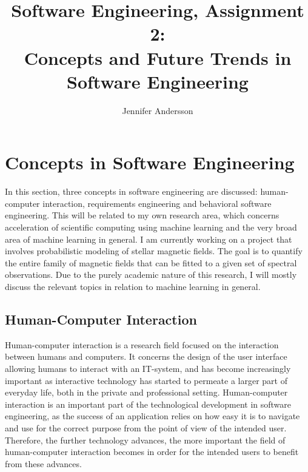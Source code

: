 \documentclass{article}
\title{Software Engineering, Assignment 2: \\ Concepts and Future Trends in Software Engineering}
\author{Jennifer Andersson}
\begin{document}
\maketitle

\section{Concepts in Software Engineering}

In this section, three concepts in software engineering are discussed: human-computer interaction, requirements engineering and behavioral software engineering. This will be related to my own research area, which concerns acceleration of scientific computing using machine learning and the very broad area of machine learning in general. I am currently working on a project that involves probabilistic modeling of stellar magnetic fields. The goal is to quantify the entire family of magnetic fields that can be fitted to a given set of spectral observations. Due to the purely academic nature of this research, I will mostly discuss the relevant topics in relation to machine learning in general.

\subsection{Human-Computer Interaction}

Human-computer interaction is a research field focused on the interaction between humans and computers. It concerns the design of the user interface allowing humans to interact with an IT-system, and has become increasingly important as interactive technology has started to permeate a larger part of everyday life, both in the private and professional setting. Human-computer interaction is an important part of the technological development in software engineering, as the success of an application relies on how easy it is to navigate and use for the correct purpose from the point of view of the intended user. Therefore, the further technology advances, the more important the field of human-computer interaction becomes in order for the intended users to benefit from these advances. 
\end{document}
